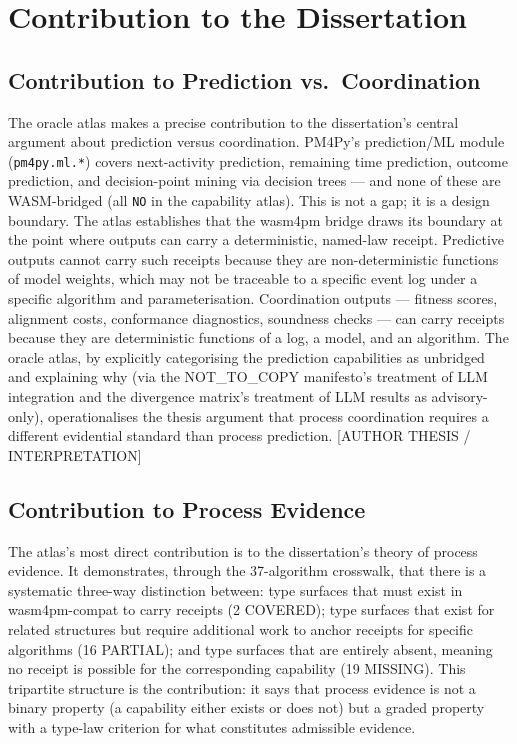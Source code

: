 
\section{Contribution to the Dissertation}
\label{sec:sources-pm4py-contribution}

\subsection{Contribution to Prediction vs.~Coordination}
\label{sec:sources-pm4py-contribution-prediction}

The oracle atlas makes a precise contribution to the dissertation's central argument about
prediction versus coordination. PM4Py's prediction/ML module (\texttt{pm4py.ml.*}) covers
next-activity prediction, remaining time prediction, outcome prediction, and decision-point
mining via decision trees --- and none of these are WASM-bridged (all \texttt{NO} in the
capability atlas). This is not a gap; it is a design boundary. The atlas establishes that
the wasm4pm bridge draws its boundary at the point where outputs can carry a deterministic,
named-law receipt. Predictive outputs cannot carry such receipts because they are
non-deterministic functions of model weights, which may not be traceable to a specific
event log under a specific algorithm and parameterisation. Coordination outputs --- fitness
scores, alignment costs, conformance diagnostics, soundness checks --- can carry receipts
because they are deterministic functions of a log, a model, and an algorithm. The oracle
atlas, by explicitly categorising the prediction capabilities as unbridged and explaining
why (via the NOT\_TO\_COPY manifesto's treatment of LLM integration and the divergence
matrix's treatment of LLM results as advisory-only), operationalises the thesis argument
that process coordination requires a different evidential standard than process prediction.
[AUTHOR THESIS / INTERPRETATION]

\subsection{Contribution to Process Evidence}
\label{sec:sources-pm4py-contribution-evidence}

The atlas's most direct contribution is to the dissertation's theory of process evidence.
It demonstrates, through the 37-algorithm crosswalk, that there is a systematic three-way
distinction between: type surfaces that must exist in wasm4pm-compat to carry receipts
(2 COVERED); type surfaces that exist for related structures but require additional work
to anchor receipts for specific algorithms (16 PARTIAL); and type surfaces that are
entirely absent, meaning no receipt is possible for the corresponding capability (19 MISSING).
This tripartite structure is the contribution: it says that process evidence is not a
binary property (a capability either exists or does not) but a graded property with a
type-law criterion for what constitutes admissible evidence.

